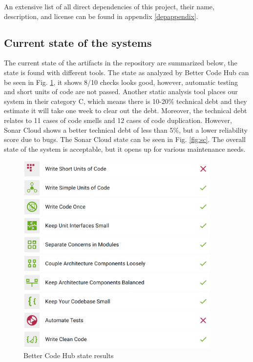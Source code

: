 \documentclass[10pt]{article}
\begin{document}
An extensive list of all direct dependencies of this project, their name, description, and license can be found in appendix \ref{depappendix}.


\subsection{Current state of the systems}
The current state of the artifacts in the repository are summarized below, the state is found with different tools.
The state as analyzed by Better Code Hub can be seen in Fig. \ref{fig:bch}, it shows 8/10 checks looks good, however, automatic testing and short units of code are not passed. Another static analysis tool places our system in their category C, which means there is 10-20\% technical debt and they estimate it will take one week to clear out the debt. Moreover, the technical debt relates to 11 cases of code smells and 12 cases of code duplication. However, Sonar Cloud shows a better technical debt of less than 5\%, but a lower reliability score due to bugs. The Sonar Cloud state can be seen in Fig. \ref{fig:sc}. The overall state of the system is acceptable, but it opens up for various maintenance needs.

\begin{figure} [H]
  \centering
  \includegraphics[width=0.9\textwidth]{images/bettercodehub.png}
  \caption{Better Code Hub state results}
  \label{fig:bch}
\end{figure}
\end{document}
